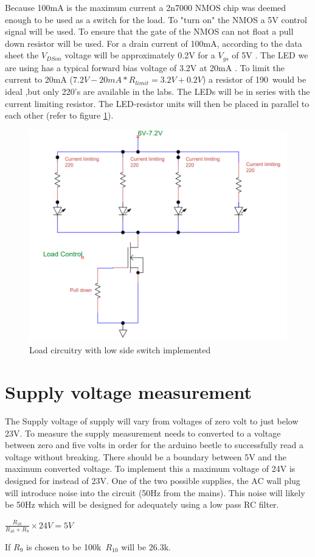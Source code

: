 \label{sec:loadcontrol_design}
Because 100mA is the maximum current a 2n7000 NMOS chip was deemed enough to be used as a switch for the load. To "turn on" the NMOS a 5V control signal will be used. To ensure that the gate of the NMOS can not float a pull down resistor will be used. For a drain current of 100mA, according to the data sheet the $V_{DSon}$ voltage will be approximately 0.2V for a $V_{gs}$ of 5V \cite{NData}. The LED we are using has a typical forward bias voltage of 3.2V at 20mA \cite{LED}. To limit the current to 20mA ($7.2V-20mA*R_{limit}=3.2V+0.2V$) a resistor of 190\textohm \ would be ideal ,but only 220\textohm's are available in the labs. The LEDs will be in series with the current limiting resistor. The LED-resistor units will then be placed in parallel to each other (refer to figure \ref{fig:loadcirc}).

\begin{figure}[!htb]
    \centering
    \includegraphics[width=0.4\linewidth]{Figures/loadCircuit.png}
    \caption{Load circuitry with low side switch implemented}
    \label{fig:loadcirc}
\end{figure}

\newpage
\section{Supply voltage measurement}
The Supply voltage of supply will vary from voltages of zero volt to just below 23V. To measure the supply measurement needs to converted to a voltage between zero and five volts in order for the arduino beetle to successfully read a voltage without breaking. There should be a boundary between 5V and the maximum converted voltage. To implement this a maximum voltage of 24V is designed for instead of 23V. One of the two possible supplies, the AC wall plug will introduce noise into the circuit (50Hz from the mains). This noise will likely be 50Hz which will be designed for adequately using a low pass RC filter.


\begin{center}
	$\frac{R_{10}}{R_{10}+R_9}\times24V=5V$
\end{center}
If $R_9$ is chosen to be 100k\textohm \ $R_{10}$ will be 26.3k\textohm.

